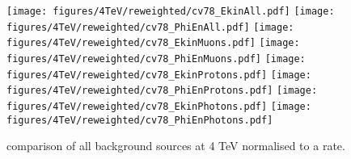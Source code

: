 \begin{figure}
\begin{center}
  \texttt{[image: figures/4TeV/reweighted/cv78\_EkinAll.pdf]}
  \texttt{[image: figures/4TeV/reweighted/cv78\_PhiEnAll.pdf]}
  \texttt{[image: figures/4TeV/reweighted/cv78\_EkinMuons.pdf]}
  \texttt{[image: figures/4TeV/reweighted/cv78\_PhiEnMuons.pdf]}
  \texttt{[image: figures/4TeV/reweighted/cv78\_EkinProtons.pdf]}
  \texttt{[image: figures/4TeV/reweighted/cv78\_PhiEnProtons.pdf]}
  \texttt{[image: figures/4TeV/reweighted/cv78\_EkinPhotons.pdf]}
  \texttt{[image: figures/4TeV/reweighted/cv78\_PhiEnPhotons.pdf]}
\end{center}
\vspace{-0.6cm}
 \caption{comparison of all background sources at 4 TeV normalised to a rate.
  \label{compAllBKG4TeV_rates}}
\end{figure}



